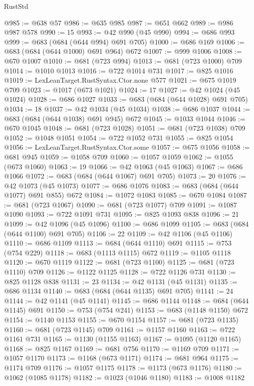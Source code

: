 \begin{lexlean}{RustStd}
\begin{coremodule}
@985 := @638 @57
@986 := @635 @985
@987 := @651 @662
@989 := @986 @987 @578
@990 := 15
@993 := @42 @990 (@45 @990)
@994 := @686 @993
@999 := @683 (@684 (@644 @994) @691 @705)
@1000 := @686 @169
@1006 := @683 (@684 (@644 @1000) @691 @964) @672
@1007 := @999 @1006
@1008 := @670 @1007
@1010 := @681 (@723 @994)
@1013 := @681 (@723 @1000) @709
@1014 := @1010 @1013
@1016 := @722 @1014 @731
@1017 := @825 @1016
@1019 := LexLeanTarget.RustSyntax.Ctor.none @577
@1021 := @675 @1019 @709
@1023 := @1017 (@673 @1021)
@1024 := 17
@1027 := @42 @1024 (@45 @1024)
@1028 := @686 @1027
@1033 := @683 (@684 (@644 @1028) @691 @705)
@1034 := 18
@1037 := @42 @1034 (@45 @1034)
@1038 := @686 @1037
@1044 := @683 (@684 (@644 @1038) @691 @945) @672
@1045 := @1033 @1044
@1046 := @670 @1045
@1048 := @681 (@723 @1028)
@1051 := @681 (@723 @1038) @709
@1052 := @1048 @1051
@1054 := @722 @1052 @731
@1055 := @825 @1054
@1056 := LexLeanTarget.RustSyntax.Ctor.some
@1057 := @675 @1056
@1058 := @681 @945
@1059 := @1058 @709
@1060 := @1057 @1059
@1062 := @1055 (@673 @1060)
@1063 := 19
@1066 := @42 @1063 (@45 @1063)
@1067 := @686 @1066
@1072 := @683 (@684 (@644 @1067) @691 @705)
@1073 := 20
@1076 := @42 @1073 (@45 @1073)
@1077 := @686 @1076
@1083 := @683 (@684 (@644 @1077) @691 @855) @672
@1084 := @1072 @1083
@1085 := @670 @1084
@1087 := @681 (@723 @1067)
@1090 := @681 (@723 @1077) @709
@1091 := @1087 @1090
@1093 := @722 @1091 @731
@1095 := @825 @1093 @838
@1096 := 21
@1099 := @42 @1096 (@45 @1096)
@1100 := @686 @1099
@1105 := @683 (@684 (@644 @1100) @691 @705)
@1106 := 22
@1109 := @42 @1106 (@45 @1106)
@1110 := @686 @1109
@1113 := @684 (@644 @1110) @691
@1115 := @753 (@754 @229)
@1118 := @683 (@1113 @1115) @672
@1119 := @1105 @1118
@1120 := @670 @1119
@1122 := @681 (@723 @1100)
@1125 := @681 (@723 @1110) @709
@1126 := @1122 @1125
@1128 := @722 @1126 @731
@1130 := @825 @1128 @838
@1131 := 23
@1134 := @42 @1131 (@45 @1131)
@1135 := @686 @1134
@1140 := @683 (@684 (@644 @1135) @691 @705)
@1141 := 24
@1144 := @42 @1141 (@45 @1141)
@1145 := @686 @1144
@1148 := @684 (@644 @1145) @691
@1150 := @753 (@754 @241)
@1153 := @683 (@1148 @1150) @672
@1154 := @1140 @1153
@1155 := @670 @1154
@1157 := @681 (@723 @1135)
@1160 := @681 (@723 @1145) @709
@1161 := @1157 @1160
@1163 := @722 @1161 @731
@1165 := @1130 (@1155 @1163)
@1167 := @1095 (@1120 @1165)
@1168 := @825 @1167
@1169 := @681 @756
@1170 := @1169 @709
@1171 := @1057 @1170
@1173 := @1168 (@673 @1171)
@1174 := @681 @964
@1175 := @1174 @709
@1176 := @1057 @1175
@1178 := @1173 (@673 @1176)
@1180 := @1062 (@1085 @1178)
@1182 := @1023 (@1046 @1180)
@1183 := @1008 @1182

\end{coremodule}
\end{lexlean}
